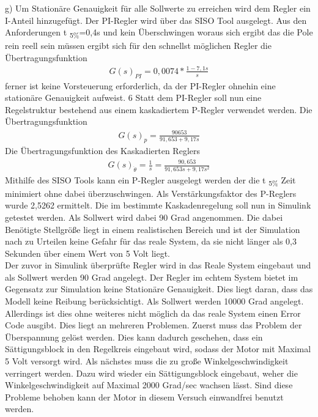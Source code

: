 \documentclass[10pt]{scrartcl}
\begin{document}
g)	Um Stationäre Genauigkeit für alle Sollwerte zu erreichen wird dem Regler ein I-Anteil hinzugefügt. Der PI-Regler wird über das SISO Tool ausgelegt. Aus den Anforderungen t \textsubscript{5\%}=0,4s und kein Überschwingen woraus sich ergibt das die Pole rein reell sein müssen ergibt sich für den schnellst möglichen Regler die Übertragungsfunktion
\begin{align}
   G(s)_{PI}=0,0074*\frac{1-7,1s}{s}
\end{align} 
ferner ist keine Vorsteuerung erforderlich, da der PI-Regler ohnehin eine stationäre Genauigkeit aufweist. 
6
	Statt dem PI-Regler soll nun eine Regelstruktur bestehend aus einem kaskadiertem P-Regler verwendet werden. Die Übertragungsfunktion 
\begin{align}
   G(s)_{p}=\frac{90653}{91,653+9,17s}
\end{align} 
	Die Übertragungsfunktion des Kaskadierten Reglers 
\begin{align}
G(s)_{ \dot{\theta}}=\frac{1}{s} = \frac{90,653}{91,653s+9,17s^2}
\end{align}
Mithilfe des SISO Tools kann ein P-Regler ausgelegt werden der die t \textsubscript{5\%} Zeit minimiert ohne dabei überzuschwingen. 
	Als Verstärkungsfaktor des P-Reglers wurde 2,5262 ermittelt.
	Die im bestimmte Kaskadenregelung soll nun in Simulink getestet werden. Als Sollwert wird dabei 90 Grad angenommen. Die dabei Benötigte Stellgröße liegt in einem realistischen Bereich und ist der Simulation nach zu Urteilen keine Gefahr für das reale System, da sie nicht länger als 0,3 Sekunden über einem Wert von 5 Volt liegt.\\
	Der zuvor in Simulink überprüfte Regler wird in das Reale System eingebaut und als Sollwert werden 90 Grad angelegt. Der Regler im echtem System bietet im Gegensatz zur Simulation keine Stationäre Genauigkeit. Dies liegt daran, dass das Modell keine Reibung berücksichtigt.
	Als Sollwert werden 10000 Grad angelegt.
 Allerdings ist dies ohne weiteres nicht möglich da das reale System einen Error Code ausgibt. 
Dies liegt an mehreren Problemen.
	Zuerst muss das Problem der Überspannung gelöst werden. Dies kann dadurch geschehen, dass ein Sättigungsblock in den Regelkreis eingebaut wird, sodass der Motor mit Maximal 5 Volt versorgt wird. Als nächstes muss die zu große Winkelgeschwindigkeit verringert werden. Dazu wird wieder ein Sättigungsblock eingebaut, weher die Winkelgeschwindigkeit auf Maximal 2000 Grad/sec wachsen lässt. Sind diese Probleme behoben kann der Motor in diesem Versuch einwandfrei benutzt werden. 
\end{document}
